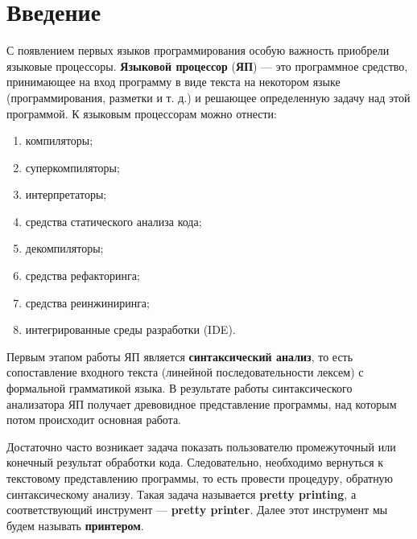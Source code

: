 \section*{Введение}


С появлением первых языков программирования особую важность приобрели языковые процессоры. \textbf{Языковой процессор} (\textbf{ЯП}) --- это программное средство, принимающее на вход программу в виде текста на некотором языке (программирования, разметки и т. д.) и решающее определенную задачу над этой программой. К языковым процессорам можно отнести:
\begin{enumerate}
\item компиляторы;
\item суперкомпиляторы;
\item интерпретаторы;
\item средства статического анализа кода;
\item декомпиляторы;
\item средства рефакторинга;
\item средства реинжиниринга;
\item интегрированные среды разработки (IDE).
\end{enumerate}

Первым этапом работы ЯП является \textbf{синтаксический анализ}, то есть сопоставление входного текста (линейной последовательности лексем) с формальной грамматикой языка. В результате работы синтаксического анализатора ЯП получает древовидное представление программы, над которым потом происходит основная работа.

Достаточно часто возникает задача показать пользователю промежуточный или конечный результат обработки кода.
Следовательно, необходимо вернуться к текстовому представлению программы, то есть провести процедуру, обратную синтаксическому анализу. Такая задача называется \textbf{pretty printing}, а соответствующий инструмент --- \textbf{pretty printer}. Далее этот инструмент мы будем называть \textbf{принтером}.

